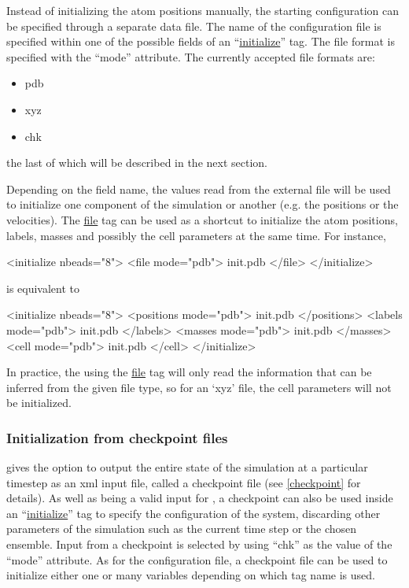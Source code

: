 \documentclass[11pt,english,fleqn]{report}
\newenvironment{code}{%
\footnotesize
\verbatim
}{
\endverbatim
\normalsize
}
\begin{document}
\label{configfile}

Instead of initializing the atom positions manually, the starting
configuration can be specified through a separate data file. The name
of the configuration file is specified within one of the possible
fields of an {}``\hyperref[INITIALIZER]{initialize}'' tag.
The file format is specified with the  {}``mode'' attribute.
The currently accepted file formats are:
\begin{itemize}
\item pdb
\item xyz
\item chk
\end{itemize}
the last of which will be described in the next section.

Depending on the field name, the values read from the external file will
be used to initialize one component of the simulation or another (e.g. the positions
or the velocities). The \hyperref[INITFILE]{file} tag can be used as a shortcut
to initialize the atom positions, labels, masses and possibly
the cell parameters at the same time. For instance,

\begin{code}
<initialize nbeads="8">
   <file mode="pdb"> init.pdb </file>
</initialize>
\end{code}

\noindent is equivalent to

\begin{code}
<initialize nbeads="8">
   <positions mode="pdb"> init.pdb </positions>
   <labels mode="pdb"> init.pdb </labels>
   <masses mode="pdb"> init.pdb </masses>
   <cell mode="pdb"> init.pdb </cell>
</initialize>
\end{code}

In practice, the using the \hyperref[INITFILE]{file} tag will only read the information that
can be inferred from the given file type, so for an `xyz' file, the cell
parameters will not be initialized.


\subsubsection{Initialization from checkpoint files}

\ipi gives the option to output the entire state of the simulation at
a particular timestep as an xml input file, called a checkpoint file
(see \ref{checkpoint} for details). As well as being a valid input
for \ipi{},  a checkpoint can also be used inside an
``\hyperref[INITIALIZER]{initialize}'' tag to specify the configuration
of the system, discarding other parameters of the simulation such as
the current time step or the chosen ensemble.
Input from a checkpoint is selected
by using {}``chk'' as the value of the {}``mode'' attribute. As
for the configuration file, a checkpoint file can be used to initialize
either one or many variables depending on which tag name is used.
\end{document}
